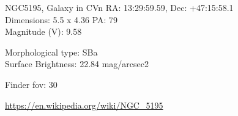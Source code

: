\begin{block}{NGC5195, Galaxy in CVn}
    RA: 13:29:59.59, Dec: +47:15:58.1 \\ 
    Dimensions: 5.5 x 4.36 PA: 79 \\ 
    Magnitude (V): 9.58

    Morphological type: SBa \\ 
    Surface Brightness: 22.84 mag/arcsec2 


    Finder fov: 30 

    \url{https://en.wikipedia.org/wiki/NGC_5195} 
\end{block}